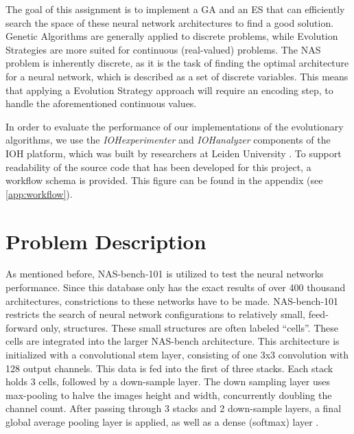\documentclass{article}
\begin{document}
The goal of this assignment is to implement a GA and an ES that can efficiently search the space of these neural network architectures to find a good solution.
Genetic Algorithms are generally applied to discrete problems, while Evolution Strategies are more suited for continuous (real-valued) problems.
The NAS problem is inherently discrete, as it is the task of finding the optimal architecture for a neural network, which is described as a set of discrete variables.
This means that applying a Evolution Strategy approach will require an encoding step, to handle the aforementioned continuous values.

In order to evaluate the performance of our implementations of the evolutionary algorithms, we use the \textit{IOHexperimenter} and \textit{IOHanalyzer} components of the IOH platform, which was built by researchers at Leiden University \cite{IOH}.
To support readability of the source code that has been developed for this project, a workflow schema is provided.
This figure can be found in the appendix (see \ref{app:workflow}).



\section{Problem Description}
\label{sec:prob}

As mentioned before, NAS-bench-101 is utilized to test the neural networks performance.
Since this database only has the exact results of over 400 thousand architectures, constrictions to these networks have to be made.
NAS-bench-101 restricts the search of neural network configurations to relatively small, feed-forward only, structures.
These small structures are often labeled ``cells''.
These cells are integrated into the larger NAS-bench architecture.
This architecture is initialized with a convolutional stem layer, consisting of one 3x3 convolution with 128 output channels.
This data is fed into the first of three stacks.
Each stack holds 3 cells, followed by a down-sample layer.
The down sampling layer uses max-pooling to halve the images height and width, concurrently doubling the channel count.
After passing through 3 stacks and 2 down-sample layers, a final global average pooling layer is applied, as well as a dense (softmax) layer \cite{nas}.
\end{document}
